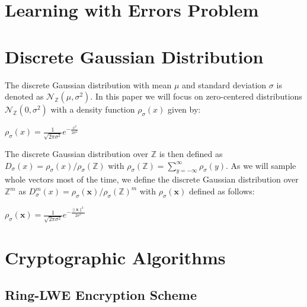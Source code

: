 \section{Learning with Errors Problem}

\section{Discrete Gaussian Distribution}
The discrete Gaussian distribution with mean \(\mu\) and standard deviation \(\sigma\) is denoted as \(\mathcal{N}_\mathbb{Z} (\mu, \sigma^2)\). In this paper we will focus on zero-centered distributions \(\mathcal{N}_\mathbb{Z} (0, \sigma^2)\) with a density function \(\rho_\sigma(x)\) given by:
\begin{center}
	\(\rho_\sigma(x)=\frac{1}{\sqrt{2\pi \sigma^2}}e^{-\frac{x^2}{2\sigma^2}}\)
\end{center}
The discrete Gaussian distribution over \(\mathbb{Z}\) is then defined as \(D_\sigma(x)=\rho_\sigma(x)/\rho_\sigma(\mathbb{Z})\) with \(\rho_\sigma(\mathbb{Z})=\sum_{y=-\infty}^{\infty} \rho_\sigma(y)\). As we will sample whole vectors most of the time, we define the discrete Gaussian distribution over \(\mathbb{Z}^m\) as \(D_\sigma^m(x)=\rho_\sigma(\textbf{x})/\rho_\sigma(\mathbb{Z})^m\) with \(\rho_\sigma(\textbf{x})\) defined as follows:
\begin{center}
	\(\rho_\sigma(\textbf{x})=\frac{1}{\sqrt{2\pi \sigma^2}}e^{-\frac{\|\textbf{x}\|^2}{2\sigma^2}}\)
\end{center}
\section{Cryptographic Algorithms}

\subsection{Ring-LWE Encryption Scheme}

